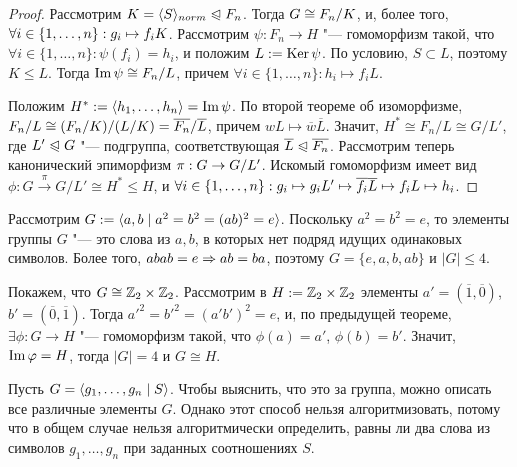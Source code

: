 \begin{proof}
	Рассмотрим $K = \langle S\rangle_{norm} \trianglelefteqslant F_n$. Тогда $G \hm\cong F_n/K$, и, более того, $\forall i \hm\in \{1, \dotsc, n\}: g_i \mapsto f_iK$. Рассмотрим $\psi: F_n \to H$ "--- гомоморфизм такой, что $\forall i \in \{1, \dotsc, n\}: \psi(f_i) = h_i$, и положим $L := \operatorname{Ker}\psi$. По условию, $S \subset L$, поэтому $K \le L$. Тогда $\operatorname{Im}\psi \cong F_n / L$, причем $\forall i \in \{1, \dotsc, n\}: h_i \mapsto f_iL$.
	
	Положим $H^* := \langle h_1, \dotsc, h_n\rangle = \operatorname{Im}\psi$. По второй теореме об изоморфизме, $F_n / L \hm\cong (F_n / K) / (L / K) = \overline{F_n} / \overline{L}$, причем $wL \mapsto \overline{w}\overline{L}$. Значит, $H^*  \cong F_n / L \cong G / L'$, где $L' \trianglelefteqslant G$ "--- подгруппа, соответствующая $\overline{L} \trianglelefteqslant \overline{F_n}$. Рассмотрим теперь канонический эпиморфизм $\pi: G \hm\to G / L'$. Искомый гомоморфизм имеет вид $\phi: G \xrightarrow{\pi} G / L' \cong H^* \le H$, и $\forall i \in \{1, \dotsc, n\}: g_i \mapsto g_iL' \mapsto \overline{f_i}\overline{L} \hm\mapsto f_iL \mapsto h_i$.
\end{proof}

\begin{example}
	Рассмотрим $G := \langle a, b\mid a^2=b^2=(ab)^2 = e\rangle$. Поскольку $a^2 = b^2 = e$, то элементы группы $G$ "--- это слова из $a, b$, в которых нет подряд идущих одинаковых символов. Более того, $abab = e \ra ab \hm= ba$, поэтому $G = \{e, a, b, ab\}$ и $|G| \le 4$.
	
	Покажем, что $G \cong \mathbb{Z}_2\times\mathbb{Z}_2$. Рассмотрим в $H := \mathbb{Z}_2\times\mathbb{Z}_2$ элементы $a' = (\overline{1}, \overline{0})$, $b' = (\overline{0}, \overline{1})$. Тогда $a'^2 = b'^2 = (a'b')^2 = e$, и, по предыдущей теореме, $\exists \phi: G \to H$ "--- гомоморфизм такой, что $\phi(a) = a'$, $\phi(b) = b'$. Значит, $\operatorname{Im}\varphi = H$, тогда $|G| = 4$ и $G \cong H$.
\end{example}

\begin{note}
	Пусть $G = \langle g_1, \dotsc, g_n\mid S\rangle$. Чтобы выяснить, что это за группа, можно описать все различные элементы $G$. Однако этот способ нельзя алгоритмизовать, потому что в общем случае нельзя алгоритмически определить, равны ли два слова из символов $g_1, \dotsc, g_n$ при заданных соотношениях $S$.
\end{note}